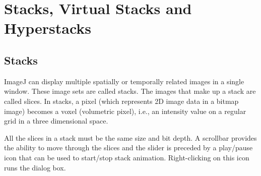 \section{Stacks, Virtual Stacks and Hyperstacks\label{sec:StacksVirtualStacksHyperStks}}


\subsection*{Stacks\label{sub:Stacks-Intro}}

ImageJ can display multiple spatially or temporally related images
in a single window. These image sets are called stacks. The images
that make up a stack are called slices. In stacks,
a pixel (which represents 2D image data in a bitmap image) becomes
a voxel (volumetric pixel),
i.e., an intensity value on a regular grid in a three dimensional
space. 

All the slices in a stack must be the same size and bit depth. A scrollbar
provides the ability to move through the slices and the slider is
preceded by a play/pause icon that can be used to start/stop stack
animation. Right-clicking on this icon runs the 
dialog box.

